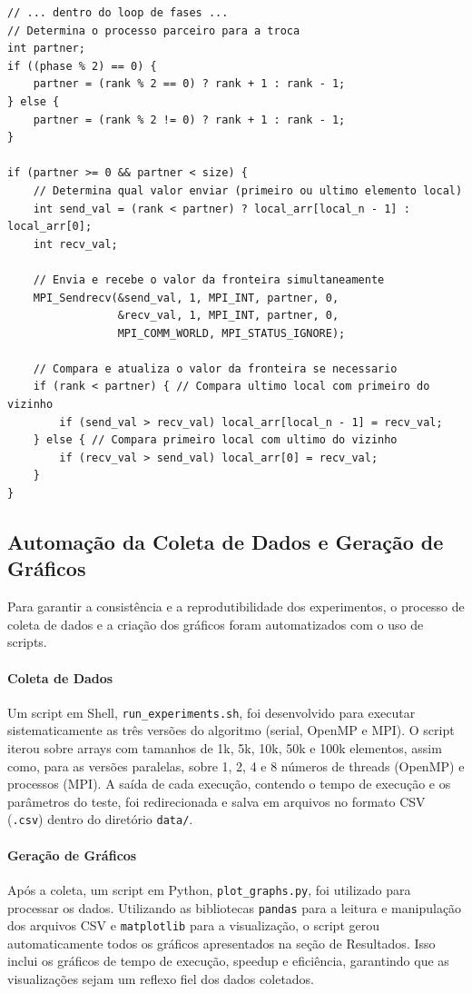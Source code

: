 \documentclass[12pt, a4paper]{article}
\begin{document}
\begin{lstlisting}[caption={Lógica de comunicação de fronteira na implementação MPI.}, label=lst:mpi]
// ... dentro do loop de fases ...
// Determina o processo parceiro para a troca
int partner;
if ((phase % 2) == 0) {
    partner = (rank % 2 == 0) ? rank + 1 : rank - 1;
} else {
    partner = (rank % 2 != 0) ? rank + 1 : rank - 1;
}

if (partner >= 0 && partner < size) {
    // Determina qual valor enviar (primeiro ou ultimo elemento local)
    int send_val = (rank < partner) ? local_arr[local_n - 1] : local_arr[0];
    int recv_val;
    
    // Envia e recebe o valor da fronteira simultaneamente
    MPI_Sendrecv(&send_val, 1, MPI_INT, partner, 0,
                 &recv_val, 1, MPI_INT, partner, 0,
                 MPI_COMM_WORLD, MPI_STATUS_IGNORE);

    // Compara e atualiza o valor da fronteira se necessario
    if (rank < partner) { // Compara ultimo local com primeiro do vizinho
        if (send_val > recv_val) local_arr[local_n - 1] = recv_val;
    } else { // Compara primeiro local com ultimo do vizinho
        if (recv_val > send_val) local_arr[0] = recv_val;
    }
}
\end{lstlisting}

\subsection{Automação da Coleta de Dados e Geração de Gráficos}
Para garantir a consistência e a reprodutibilidade dos experimentos, o processo de coleta de dados e a criação dos gráficos foram automatizados com o uso de scripts.

\paragraph{Coleta de Dados}
Um script em Shell, \texttt{run\_experiments.sh}, foi desenvolvido para executar sistematicamente as três versões do algoritmo (serial, OpenMP e MPI). O script iterou sobre arrays com tamanhos de 1k, 5k, 10k, 50k e 100k elementos, assim como, para as versões paralelas, sobre 1, 2, 4 e 8 números de threads (OpenMP) e processos (MPI). A saída de cada execução, contendo o tempo de execução e os parâmetros do teste, foi redirecionada e salva em arquivos no formato CSV (\texttt{.csv}) dentro do diretório \texttt{data/}.

\paragraph{Geração de Gráficos}
Após a coleta, um script em Python, \texttt{plot\_graphs.py}, foi utilizado para processar os dados. Utilizando as bibliotecas \texttt{pandas} para a leitura e manipulação dos arquivos CSV e \texttt{matplotlib} para a visualização, o script gerou automaticamente todos os gráficos apresentados na seção de Resultados. Isso inclui os gráficos de tempo de execução, speedup e eficiência, garantindo que as visualizações sejam um reflexo fiel dos dados coletados.
\end{document}
